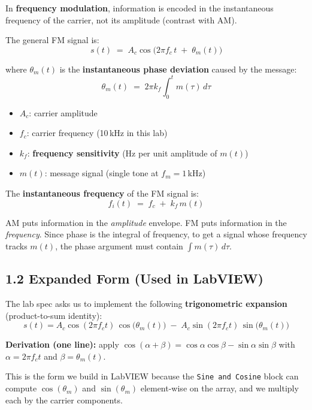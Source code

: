 \documentclass[../../main.tex]{subfiles}
\begin{document}
In \textbf{frequency modulation}, information is encoded in the instantaneous frequency of the carrier, not its amplitude (contrast with AM).

The general FM signal is:
\[
  s(t) \;=\; A_c \cos\!\Big(2\pi f_c\, t \;+\; \theta_m(t)\Big)
\]

where $\theta_m(t)$ is the \textbf{instantaneous phase deviation} caused by the message:
\[
  \theta_m(t) \;=\; 2\pi k_f \int_0^{t} m(\tau)\,d\tau
\]

\begin{itemize}[leftmargin=1.5em]
  \item $A_c$: carrier amplitude
  \item $f_c$: carrier frequency (10\,kHz in this lab)
  \item $k_f$: \textbf{frequency sensitivity} (Hz per unit amplitude of $m(t)$)
  \item $m(t)$: message signal (single tone at $f_m = 1$\,kHz)
\end{itemize}

The \textbf{instantaneous frequency} of the FM signal is:
\[
  f_i(t) \;=\; f_c \;+\; k_f\, m(t)
\]

\begin{IntuitionBox}
AM puts information in the \emph{amplitude} envelope. FM puts information in the \emph{frequency}. Since phase is the integral of frequency, to get a signal whose frequency tracks $m(t)$, the phase argument must contain $\int m(\tau)\,d\tau$.
\end{IntuitionBox}

\vspace{1em}

\subsection{1.2 \; Expanded Form (Used in LabVIEW)}

The lab spec asks us to implement the following \textbf{trigonometric expansion} (product-to-sum identity):
\[
\boxed{
  s(t) = A_c \cos(2\pi f_c t)\,\cos\!\big(\theta_m(t)\big)
       \;-\; A_c \sin(2\pi f_c t)\,\sin\!\big(\theta_m(t)\big)
}
\]

\textbf{Derivation (one line):} apply $\cos(\alpha + \beta) = \cos\alpha\cos\beta - \sin\alpha\sin\beta$ with $\alpha = 2\pi f_c t$ and $\beta = \theta_m(t)$.

This is the form we build in LabVIEW because the \texttt{Sine and Cosine} block can compute $\cos(\theta_m)$ and $\sin(\theta_m)$ element-wise on the array, and we multiply each by the carrier components.
\end{document}
